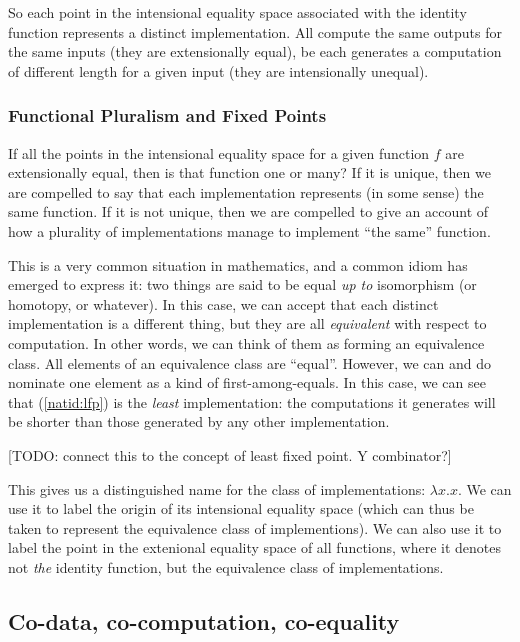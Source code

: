 \documentclass{article}
\begin{document}
So each point in the intensional equality space associated with the
identity function represents a distinct implementation. All compute
the same outputs for the same inputs (they are extensionally equal),
be each generates a computation of different length for a given input
(they are intensionally unequal).

\subsubsection{Functional Pluralism and Fixed Points}

If all the points in the intensional equality space for a given
function \(f\) are extensionally equal, then is that function one or
many? If it is unique, then we are compelled to say that each
implementation represents (in some sense) the same function. If it is
not unique, then we are compelled to give an account of how a
plurality of implementations manage to implement ``the same''
function.

This is a very common situation in mathematics, and a common idiom has
emerged to express it: two things are said to be equal \textit{up to}
isomorphism (or homotopy, or whatever). In this case, we can accept
that each distinct implementation is a different thing, but they are
all \textit{equivalent} with respect to computation. In other words,
we can think of them as forming an equivalence class. All elements of
an equivalence class are ``equal''. However, we can and do nominate
one element as a kind of first-among-equals. In this case, we can see
that (\ref{natid:lfp}) is the \textit{least} implementation: the
computations it generates will be shorter than those generated by any
other implementation.

[TODO: connect this to the concept of least fixed point. Y combinator?]

This gives us a distinguished name for the class of implementations:
\(\lambda x.x\). We can use it to label the origin of its intensional
equality space (which can thus be taken to represent the equivalence
class of implementions). We can also use it to label the point in the
extenional equality space of all functions, where it denotes not
\textit{the} identity function, but the equivalence class of
implementations.

\subsection{Co-data, co-computation, co-equality}
\end{document}
